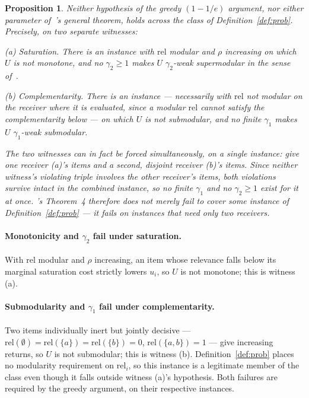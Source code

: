 \documentclass[sigconf,anonymous]{aamas}
\newtheorem{proposition}{Proposition}
\theoremstyle{remark}
\begin{document}
\begin{proposition}
\label{prop:degen}
Neither hypothesis of the greedy $(1-1/e)$ argument, nor either
parameter of~\cite{shilai2024}'s general theorem, holds across the
class of Definition~\ref{def:prob}. Precisely, on two separate
witnesses:

\emph{(a) Saturation.} There is an instance with $\mathrm{rel}$
modular and $\rho$ increasing on which $U$ is not monotone, and no
$\gamma_2 \ge 1$ makes $U$ $\gamma_2$-weak supermodular
in the sense of~\cite{shilai2024}.

\emph{(b) Complementarity.} There is an instance --- necessarily with
$\mathrm{rel}$ \emph{not} modular on the receiver where it is
evaluated, since a modular $\mathrm{rel}$ cannot satisfy the
complementarity below --- on which $U$ is not submodular, and no
finite $\gamma_1$ makes $U$ $\gamma_1$-weak submodular.

The two witnesses can in fact be forced simultaneously, on a single
instance: give one receiver (a)'s items and a second, disjoint
receiver (b)'s items. Since neither witness's violating triple
involves the other receiver's items, both violations survive intact
in the combined instance, so no finite $\gamma_1$ \emph{and} no
$\gamma_2\ge1$ exist for it at once. \cite{shilai2024}'s Theorem~4
therefore does not merely fail to cover some instance of
Definition~\ref{def:prob} --- it fails on instances that need only two
receivers.
\end{proposition}

\paragraph{Monotonicity and $\gamma_2$ fail under saturation.} With
$\mathrm{rel}$ modular and $\rho$ increasing, an item whose relevance
falls below its marginal saturation cost strictly lowers $u_i$, so $U$
is not monotone; this is witness (a).

\paragraph{Submodularity and $\gamma_1$ fail under complementarity.}
Two items individually inert but jointly decisive ---
$\mathrm{rel}(\emptyset)=\mathrm{rel}(\{a\})=\mathrm{rel}(\{b\})=0$,
$\mathrm{rel}(\{a,b\})=1$ --- give increasing returns, so $U$ is not
submodular; this is witness (b). Definition~\ref{def:prob} places no
modularity requirement on $\mathrm{rel}_i$, so this instance is a
legitimate member of the class even though it falls outside witness
(a)'s hypothesis. Both failures are required by the greedy argument,
on their respective instances.
\end{document}
